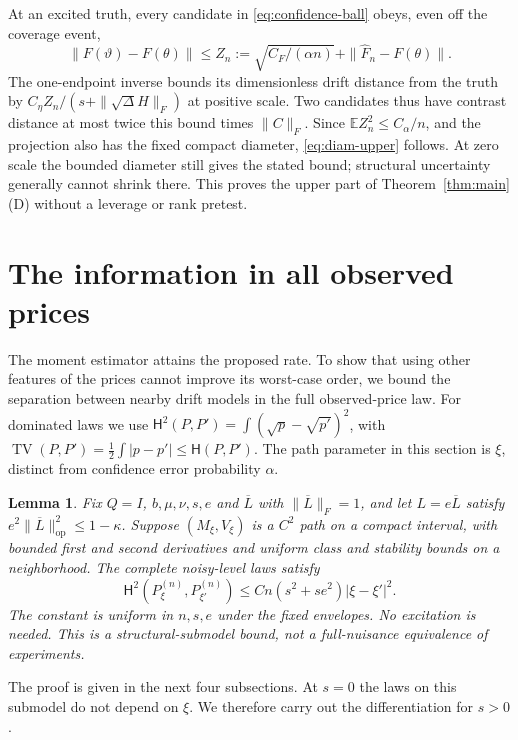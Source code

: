 \documentclass[11pt,a4paper]{amsart}
\theoremstyle{plain}
\newtheorem{lemma}[theorem]{Lemma}
\theoremstyle{definition}
\theoremstyle{remark}
\newcommand{\EE}{\mathbb{E}}
\DeclareMathOperator{\TV}{TV}
\newcommand{\Hell}{\mathsf H}
\begin{document}
At an excited truth, every candidate in \eqref{eq:confidence-ball} obeys,
even off the coverage event,
\[
 \|F(\vartheta)-F(\theta)\|
 \le Z_n:=\sqrt{C_F/(\alpha n)}+\|\widehat F_n-F(\theta)\|.
\]
The one-endpoint inverse bounds its dimensionless drift distance from the
truth by $C_\eta Z_n/(s+\|\sqrt\Delta H\|_F)$ at positive scale.
Two candidates thus have contrast distance at most twice this bound times
$\|C\|_F$. Since $\EE Z_n^2\le C_\alpha/n$, and the projection also has
the fixed compact diameter, \eqref{eq:diam-upper} follows. At zero scale
the bounded diameter still gives the stated bound; structural uncertainty
generally cannot shrink there. This proves the upper part of Theorem~\ref{thm:main}(D)
without a leverage or rank pretest.

\section{The information in all observed prices}\label{sec:information}

The moment estimator attains the proposed rate. To show that using other
features of the prices cannot improve its worst-case order, we bound the
separation between nearby drift models in the full observed-price law.
For dominated laws we use
$\Hell^2(P,P')=\int(\sqrt p-\sqrt{p'})^2$, with
$\TV(P,P')=\frac12\int|p-p'|\le\Hell(P,P')$.
The path parameter in this section is $\xi$, distinct from confidence
error probability $\alpha$.

\begin{lemma}\label{lem:all-price}
Fix $Q=I$, $b,\mu,\nu,s,e$ and $\overline L$ with
$\|\overline L\|_F=1$, and let $L=e\overline L$ satisfy
$e^2\|\overline L\|_{\mathrm{op}}^2\le1-\kappa$. Suppose
$(M_\xi,V_\xi)$ is a $C^2$ path on a compact interval, with bounded
first and second derivatives and uniform class and stability bounds on
a neighborhood. The complete noisy-level laws satisfy
\begin{equation}\label{eq:price-Hellinger}
 \Hell^2(P_\xi^{(n)},P_{\xi'}^{(n)})
 \le Cn(s^2+se^2)|\xi-\xi'|^2.
\end{equation}
The constant is uniform in $n,s,e$ under the fixed envelopes. No
excitation is needed. This is a structural-submodel bound, not a
full-nuisance equivalence of experiments.
\end{lemma}

The proof is given in the next four subsections. At $s=0$ the laws on this
submodel do not depend on $\xi$. We therefore carry out the differentiation
for $s>0$.
\end{document}
